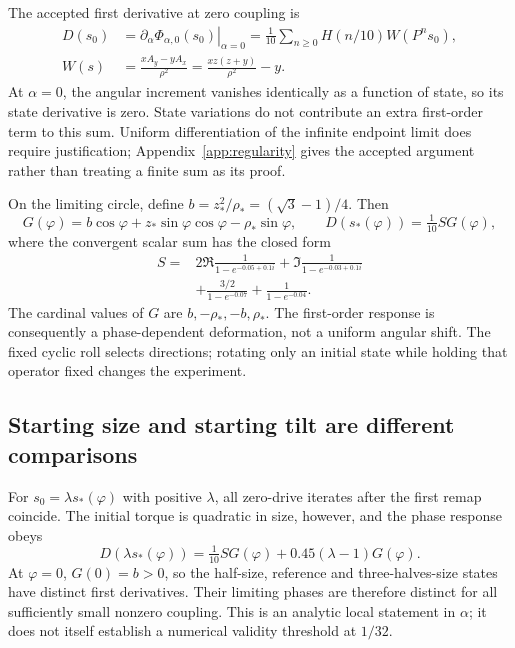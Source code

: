 \documentclass[11pt,a4paper]{article}
\numberwithin{equation}{section}
\begin{document}
The accepted first derivative at zero coupling is
\begin{equation}\label{eq:firstresponse}
\begin{aligned}
D(s_0)&=\left.\partial_\alpha\Phi_{\alpha,0}(s_0)\right|_{\alpha=0}
=\frac1{10}\sum_{n\ge0}H(n/10)W(P^ns_0),\\
W(s)&=\frac{xA_y-yA_x}{\rho^2}=\frac{xz(z+y)}{\rho^2}-y.
\end{aligned}
\end{equation}
At $\alpha=0$, the angular increment vanishes identically as a function of state, so its state derivative is zero. State variations do not contribute an extra first-order term to this sum. Uniform differentiation of the infinite endpoint limit does require justification; Appendix~\ref{app:regularity} gives the accepted argument rather than treating a finite sum as its proof.

On the limiting circle, define $b=z_*^2/\rho_*=(\sqrt3-1)/4$. Then
\begin{equation}\label{eq:G}
G(\varphi)=b\cos\varphi+z_*\sin\varphi\cos\varphi-\rho_*\sin\varphi,
\qquad D(s_*(\varphi))=\tfrac1{10}S G(\varphi),
\end{equation}
where the convergent scalar sum has the closed form
\begin{equation}\label{eq:S}
\begin{aligned}
S={}&2\Re\frac1{1-e^{-0.05+0.1i}}+
\Im\frac1{1-e^{-0.03+0.1i}}\\
&+\frac{3/2}{1-e^{-0.07}}+\frac1{1-e^{-0.04}}.
\end{aligned}
\end{equation}
The cardinal values of $G$ are $b,-\rho_*,-b,\rho_*$. The first-order response is consequently a phase-dependent deformation, not a uniform angular shift. The fixed cyclic roll selects directions; rotating only an initial state while holding that operator fixed changes the experiment.

\subsection{Starting size and starting tilt are different comparisons}
For $s_0=\lambda s_*(\varphi)$ with positive $\lambda$, all zero-drive iterates after the first remap coincide. The initial torque is quadratic in size, however, and the phase response obeys
\begin{equation}\label{eq:size}
D(\lambda s_*(\varphi))=\tfrac1{10}SG(\varphi)+0.45(\lambda-1)G(\varphi).
\end{equation}
At $\varphi=0$, $G(0)=b>0$, so the half-size, reference and three-halves-size states have distinct first derivatives. Their limiting phases are therefore distinct for all sufficiently small nonzero coupling. This is an analytic local statement in $\alpha$; it does not itself establish a numerical validity threshold at $1/32$.
\end{document}
